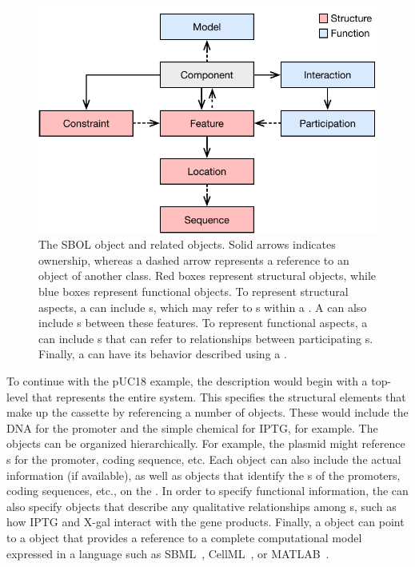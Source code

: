 \begin{figure}[ht]
\begin{center}
  \includegraphics[scale=0.85]{images/SBOL3-main-classes.pdf}
\caption{The SBOL  object and related objects.  
	Solid arrows indicates ownership, whereas a dashed arrow represents a reference to an object of another class.  
	Red boxes represent structural objects, while blue boxes represent functional objects.  
	To represent structural aspects, a  can include s, which may refer to s within a . 
	A  can also include s between these features.  
	To represent functional aspects, a  can include s that can refer to relationships between participating s.  
	Finally, a  can have its behavior described using a .}
\label{images:overview1}
\end{center}
\end{figure}

To continue with the pUC18 example, the description would begin with a top-level  that represents the entire system.  
This  specifies the structural elements that make up the cassette by referencing a number of  objects. These would include the DNA  for the promoter and the simple chemical
 for IPTG, for example.  
The  objects can be organized hierarchically.  
For example, the plasmid  might reference s for the promoter, coding sequence, etc.  
Each  object can also include the actual  information (if available), as well as  objects that identify the s of the promoters, coding sequences, etc., on the .  
In order to specify functional information, the  can also specify  objects that describe any qualitative relationships among  s, such as how IPTG and X-gal interact with the gene products.  Finally, a  object can point to a  object that provides a reference to a complete computational model expressed in a language such as SBML~\cite{SBML}, CellML~\cite{CellML}, or MATLAB~\cite{matlab}.

